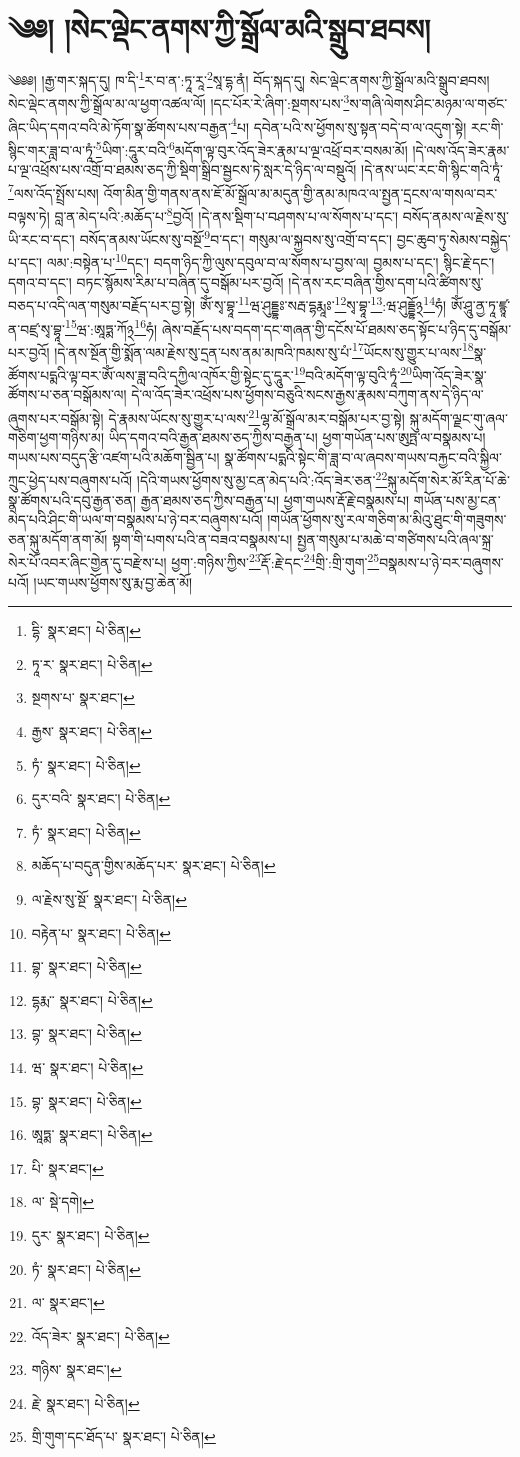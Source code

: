 \setcounter{footnote}{0} 
\chapter{༄༅། །སེང་ལྡེང་ནགས་ཀྱི་སྒྲོལ་མའི་སྒྲུབ་ཐབས།}༄༅༅། །རྒྱ་གར་སྐད་དུ། ཁ་དི་\footnote{དྷི་  སྣར་ཐང་།  པེ་ཅིན། }ར་བ་ན་:ཏཱ་རཱ་\footnote{ཏཱ་ར་  སྣར་ཐང་།  པེ་ཅིན། }སཱ་དྷ་ནཾ། བོད་སྐད་དུ། སེང་ལྡེང་ནགས་ཀྱི་སྒྲོལ་མའི་སྒྲུབ་ཐབས། སེང་ལྡེང་ནགས་ཀྱི་སྒྲོལ་མ་ལ་ཕྱག་འཚལ་ལོ། །དང་པོར་རེ་ཞིག་:སྔགས་པས་\footnote{སྔགས་པ་  སྣར་ཐང་། }ས་གཞི་ལེགས་ཤིང་མཉམ་ལ་གཙང་ཞིང་ཡིད་དགའ་བའི་མེ་ཏོག་སྣ་ཚོགས་པས་བརྒྱན་\footnote{རྒྱས་  སྣར་ཐང་།  པེ་ཅིན། }པ། དབེན་པའི་ས་ཕྱོགས་སུ་སྟན་བདེ་བ་ལ་འདུག་སྟེ། རང་གི་སྙིང་གར་ཟླ་བ་ལ་ཏཱཾ་\footnote{ཏཾ་  སྣར་ཐང་།  པེ་ཅིན། }ཡིག་:དཱུར་བའི་\footnote{དུར་བའི་  སྣར་ཐང་།  པེ་ཅིན། }མདོག་ལྟ་བུར་འོད་ཟེར་རྣམ་པ་ལྔ་འཕྲོ་བར་བསམ་མོ། །དེ་ལས་འོད་ཟེར་རྣམ་པ་ལྔ་འཕྲོས་པས་འགྲོ་བ་ཐམས་ཅད་ཀྱི་སྡིག་སྒྲིབ་སྦྱངས་ཏེ་སླར་དེ་ཉིད་ལ་བསྡུའོ། །དེ་ནས་ཡང་རང་གི་སྙིང་གའི་ཏཱཾ་\footnote{ཏཾ་  སྣར་ཐང་།  པེ་ཅིན། }ལས་འོད་སྤྲོས་པས། འོག་མིན་གྱི་གནས་ནས་ཇོ་མོ་སྒྲོལ་མ་མདུན་གྱི་ནམ་མཁའ་ལ་སྤྱན་དྲངས་ལ་གསལ་བར་བལྟས་ཏེ། བླ་ན་མེད་པའི་:མཆོད་པ་\footnote{མཆོད་པ་བདུན་གྱིས་མཆོད་པར་  སྣར་ཐང་།  པེ་ཅིན། }བྱའོ། །དེ་ནས་སྡིག་པ་བཤགས་པ་ལ་སོགས་པ་དང་། བསོད་ནམས་ལ་རྗེས་སུ་ཡི་རང་བ་དང་། བསོད་ནམས་ཡོངས་སུ་བསྔོ་\footnote{ལ་རྗེས་སུ་སྔོ་  སྣར་ཐང་།  པེ་ཅིན། }བ་དང་། གསུམ་ལ་སྐྱབས་སུ་འགྲོ་བ་དང་། བྱང་ཆུབ་ཏུ་སེམས་བསྐྱེད་པ་དང་། ལམ་:བསྟེན་པ་\footnote{བརྟེན་པ་  སྣར་ཐང་།  པེ་ཅིན། }དང་། བདག་ཉིད་ཀྱི་ལུས་དབུལ་བ་ལ་སོགས་པ་བྱས་ལ། བྱམས་པ་དང་། སྙིང་རྗེ་དང་། དགའ་བ་དང་། བཏང་སྙོམས་རིམ་པ་བཞིན་དུ་བསྒོམ་པར་བྱའོ། །དེ་ནས་རང་བཞིན་གྱིས་དག་པའི་ཚིགས་སུ་བཅད་པ་འདི་ལན་གསུམ་བརྗོད་པར་བྱ་སྟེ། ཨོཾ་སྭ་བྷཱ་\footnote{བྷ་  སྣར་ཐང་།  པེ་ཅིན། }ཝ་ཤུདྡྷཿ་སརྦ་དྷརྨཱཿ་\footnote{དྷརྨ་་  སྣར་ཐང་།  པེ་ཅིན། }སྭ་བྷཱ་\footnote{བྷ་  སྣར་ཐང་།  པེ་ཅིན། }:ཝ་ཤུདྡྷོ྅\footnote{ཝ་  སྣར་ཐང་།  པེ་ཅིན། }ཧཾ། ཨོཾ་ཤཱུ་ནྱ་ཏཱ་ཛྙཱ་ན་བཛྲ་སྭ་བྷཱ་\footnote{བྷ་  སྣར་ཐང་།  པེ་ཅིན། }ཝ་:ཨཱཏྨ་ཀོ྅\footnote{ཨཱཏྨ་  སྣར་ཐང་།  པེ་ཅིན། }ཧཾ། ཞེས་བརྗོད་པས་བདག་དང་གཞན་གྱི་དངོས་པོ་ཐམས་ཅད་སྟོང་པ་ཉིད་དུ་བསྒོམ་པར་བྱའོ། །དེ་ནས་སྔོན་གྱི་སྨོན་ལམ་རྗེས་སུ་དྲན་པས་ནམ་མཁའི་ཁམས་སུ་པཾ་\footnote{པི་  སྣར་ཐང་། }ཡོངས་སུ་གྱུར་པ་ལས་\footnote{ལ་  སྡེ་དགེ། }སྣ་ཚོགས་པདྨའི་ལྟ་བར་ཨོཾ་ལས་ཟླ་བའི་དཀྱིལ་འཁོར་གྱི་སྟེང་དུ་དཱུར་\footnote{དུར་  སྣར་ཐང་།  པེ་ཅིན། }བའི་མདོག་ལྟ་བུའི་ཏཱཾ་\footnote{ཏཾ་  སྣར་ཐང་།  པེ་ཅིན། }ཡིག་འོད་ཟེར་སྣ་ཚོགས་པ་ཅན་བསྒོམས་ལ། དེ་ལ་འོད་ཟེར་འཕྲོས་པས་ཕྱོགས་བཅུའི་སངས་རྒྱས་རྣམས་བཀུག་ནས་དེ་ཉིད་ལ་ཞུགས་པར་བསྒོམ་སྟེ། དེ་རྣམས་ཡོངས་སུ་གྱུར་པ་ལས་\footnote{ལ་  སྣར་ཐང་། }ལྷ་མོ་སྒྲོལ་མར་བསྒོམ་པར་བྱ་སྟེ། སྐུ་མདོག་ལྗང་གུ་ཞལ་གཅིག་ཕྱག་གཉིས་མ། ཡིད་དགའ་བའི་རྒྱན་ཐམས་ཅད་ཀྱིས་བརྒྱན་པ། ཕྱག་གཡོན་པས་ཨུཏྤ་ལ་བསྣམས་པ། གཡས་པས་བདུད་རྩི་འཛག་པའི་མཆོག་སྦྱིན་པ། སྣ་ཚོགས་པདྨའི་སྟེང་གི་ཟླ་བ་ལ་ཞབས་གཡས་བརྐྱང་བའི་སྐྱིལ་ཀྲུང་ཕྱེད་པས་བཞུགས་པའོ། །དེའི་གཡས་ཕྱོགས་སུ་མྱ་ངན་མེད་པའི་:འོད་ཟེར་ཅན་\footnote{འོད་ཟེར་  སྣར་ཐང་།  པེ་ཅིན། }སྐུ་མདོག་སེར་མོ་རིན་པོ་ཆེ་སྣ་ཚོགས་པའི་དབུ་རྒྱན་ཅན། རྒྱན་ཐམས་ཅད་ཀྱིས་བརྒྱན་པ། ཕྱག་གཡས་རྡོ་རྗེ་བསྣམས་པ། གཡོན་པས་མྱ་ངན་མེད་པའི་ཤིང་གི་ཡལ་ག་བསྣམས་པ་ཉེ་བར་བཞུགས་པའོ། །གཡོན་ཕྱོགས་སུ་རལ་གཅིག་མ་མིའུ་ཐུང་གི་གཟུགས་ཅན་སྐུ་མདོག་ནག་མོ། སྟག་གི་པགས་པའི་ན་བཟའ་བསྣམས་པ། སྤྱན་གསུམ་པ་མཆེ་བ་གཙིགས་པའི་ཞལ་སྐྲ་སེར་པོ་འབར་ཞིང་གྱེན་དུ་བརྫེས་པ། ཕྱག་:གཉིས་ཀྱིས་\footnote{གཉིས་  སྣར་ཐང་། }རྡོ་:རྗེ་དང་\footnote{རྗེ་  སྣར་ཐང་།  པེ་ཅིན། }གྲི་:གྲི་གུག་\footnote{གྲི་གུག་དང་ཐོད་པ་  སྣར་ཐང་།  པེ་ཅིན། }བསྣམས་པ་ཉེ་བར་བཞུགས་པའོ། །ཡང་གཡས་ཕྱོགས་སུ་རྨ་བྱ་ཆེན་མོ། 